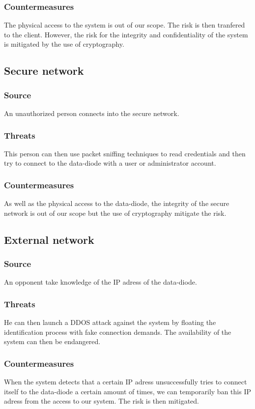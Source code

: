 \documentclass[a4paper,11pt]{article}
\begin{document}
\subsubsection{Countermeasures}
The physical access to the system is out of our scope. The risk is then tranfered to the client. However, the risk for the integrity and confidentiality of the system is mitigated by the use of cryptography.
\subsection{Secure network}
\subsubsection{Source}
An unauthorized person connects into the secure network.
\subsubsection{Threats}
This person can then use packet sniffing techniques to read credentials and then try to connect to the data-diode with a user or administrator account.
\subsubsection{Countermeasures}
As well as the physical access to the data-diode, the integrity of the secure network is out of our scope but the use of cryptography mitigate the risk.
\subsection{External network}
\subsubsection{Source}
An opponent take knowledge of the IP adress of the data-diode.
\subsubsection{Threats}
He can then launch a DDOS attack against the system by floating the identification process with fake connection demands. The availability of the system can then be endangered.
\subsubsection{Countermeasures}
When the system detects that a certain IP adress unsuccessfully tries to connect itself to the data-diode a certain amount of times, we can temporarily ban this IP adress from the access to our system.  The risk is then mitigated.
\end{document}
